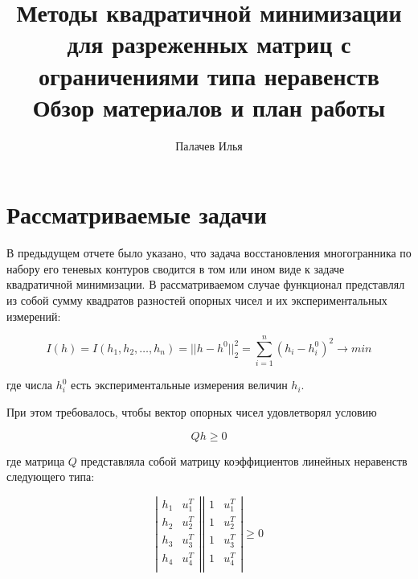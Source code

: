 \documentclass[a4paper, 12pt, titlepage]{article}
\title{Методы квадратичной минимизации для разреженных матриц с ограничениями 
типа неравенств \\ Обзор
материалов и план работы}
\author{Палачев Илья}
\theoremstyle{definition}
\theoremstyle{plain}
\theoremstyle{plain}
\begin{document}
\maketitle

\tableofcontents

\newpage
\section{Рассматриваемые задачи}
\label{sec:problem}

В предыдущем отчете было указано, что задача восстановления многогранника по 
набору его теневых контуров сводится в том или ином виде к задаче квадратичной 
минимизации. В рассматриваемом случае функционал представлял из собой сумму 
квадратов разностей опорных чисел и их экспериментальных измерений:

\begin{equation}
\label{eq:problem1}
 I(h) = I(h_{1}, h_{2}, \ldots, h_{n}) = ||h - h^{0}||_{2}^{2} =
 \sum \limits_{i = 1}^{n} (h_{i} - h_{i}^{0})^{2} \to min
\end{equation}

где числа $h_{i}^{0}$ есть экспериментальные измерения величин $h_{i}$.

При этом требовалось, чтобы вектор опорных чисел удовлетворял условию

\begin{equation}
\label{eq:problem1-cond}
 Q h \geq 0
\end{equation}

где матрица $Q$ представляла собой матрицу коэффициентов линейных неравенств
следующего типа:

\begin{equation}
\left|\begin{array}{cc}
  h_{1} & u_{1}^{T} \\
  h_{2} & u_{2}^{T} \\
  h_{3} & u_{3}^{T} \\
  h_{4} & u_{4}^{T} \\
\end{array}\right|
  \left|\begin{array}{cc}
  1 & u_{1}^{T} \\
  1 & u_{2}^{T} \\
  1 & u_{3}^{T} \\
  1 & u_{4}^{T} \\
\end{array}\right|
\geq 0
\end{equation}
\end{document}
